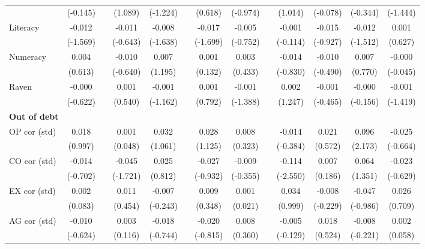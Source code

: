 \begin{table}[htbp]
{\begin{tabular}{lcccccccccccc}
          & (-0.145) &       & (1.089) & (-1.224) &       & (0.618) & (-0.974) &       & (1.014) & (-0.078) & (-0.344) & (-1.444) \\
    Literacy & -0.012 &       & -0.011 & -0.008 &       & -0.017 & -0.005 &       & -0.001 & -0.015 & -0.012 & 0.001 \\
          & (-1.569) &       & (-0.643) & (-1.638) &       & (-1.699) & (-0.752) &       & (-0.114) & (-0.927) & (-1.512) & (0.627) \\
    Numeracy & 0.004 &       & -0.010 & 0.007 &       & 0.001 & 0.003 &       & -0.014 & -0.010 & 0.007 & -0.000 \\
          & (0.613) &       & (-0.640) & (1.195) &       & (0.132) & (0.433) &       & (-0.830) & (-0.490) & (0.770) & (-0.045) \\
    Raven & -0.000 &       & 0.001 & -0.001 &       & 0.001 & -0.001 &       & 0.002 & -0.001 & -0.000 & -0.001 \\
          & (-0.622) &       & (0.540) & (-1.162) &       & (0.792) & (-1.388) &       & (1.247) & (-0.465) & (-0.156) & (-1.419) \\
    \midrule
    \textbf{Out of debt} &       &       &       &       &       &       &       &       &       &       &       &  \\
    OP cor (std) & 0.018 &       & 0.001 & 0.032 &       & 0.028 & 0.008 &       & -0.014 & 0.021 & 0.096 & -0.025 \\
          & (0.997) &       & (0.048) & (1.061) &       & (1.125) & (0.323) &       & (-0.384) & (0.572) & (2.173) & (-0.664) \\
    CO cor (std) & -0.014 &       & -0.045 & 0.025 &       & -0.027 & -0.009 &       & -0.114 & 0.007 & 0.064 & -0.023 \\
          & (-0.702) &       & (-1.721) & (0.812) &       & (-0.932) & (-0.355) &       & (-2.550) & (0.186) & (1.351) & (-0.629) \\
    EX cor (std) & 0.002 &       & 0.011 & -0.007 &       & 0.009 & 0.001 &       & 0.034 & -0.008 & -0.047 & 0.026 \\
          & (0.083) &       & (0.454) & (-0.243) &       & (0.348) & (0.021) &       & (0.999) & (-0.229) & (-0.986) & (0.709) \\
    AG cor (std) & -0.010 &       & 0.003 & -0.018 &       & -0.020 & 0.008 &       & -0.005 & 0.018 & -0.008 & 0.002 \\
          & (-0.624) &       & (0.116) & (-0.744) &       & (-0.815) & (0.360) &       & (-0.129) & (0.524) & (-0.221) & (0.058) \\

\end{tabular}}
\end{table}
